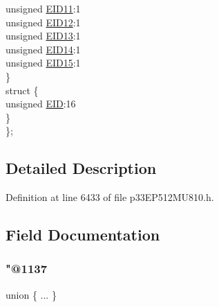 \begin{DoxyCompactItemize}
\begin{tabbing}
\>\>unsigned \hyperlink{structtag_c2_r_x_f4_e_i_d_b_i_t_s_a710bdb0d602deb021b0be99066008018}{EID11}:1\\
\>\>unsigned \hyperlink{structtag_c2_r_x_f4_e_i_d_b_i_t_s_aa347bb85867bd8d4e0124f7cff8c6472}{EID12}:1\\
\>\>unsigned \hyperlink{structtag_c2_r_x_f4_e_i_d_b_i_t_s_a37d5f3edcbf6ef62f848fd4f3c584f79}{EID13}:1\\
\>\>unsigned \hyperlink{structtag_c2_r_x_f4_e_i_d_b_i_t_s_a7ffc0b0e0d99b8476b6f9a45337c17ab}{EID14}:1\\
\>\>unsigned \hyperlink{structtag_c2_r_x_f4_e_i_d_b_i_t_s_a293cd7dc1746257fa75a60cbd9383cd7}{EID15}:1\\
\>\} \\
\>struct \{\\
\>\>unsigned \hyperlink{structtag_c2_r_x_f4_e_i_d_b_i_t_s_ae80b378c9141f7c03e0b4e55b5f4b54d}{EID}:16\\
\>\} \\
\}; \\

\end{tabbing}\end{DoxyCompactItemize}


\subsection{Detailed Description}


Definition at line 6433 of file p33\+E\+P512\+M\+U810.\+h.



\subsection{Field Documentation}
\mbox{\label{structtag_c2_r_x_f4_e_i_d_b_i_t_s_a7eab920b9da5f51734c5407b285c7086}} 
\subsubsection{\texorpdfstring{"@1137}{@1137}}
{\footnotesize\ttfamily union \{ ... \} }

\mbox{\label{structtag_c2_r_x_f4_e_i_d_b_i_t_s_ae80b378c9141f7c03e0b4e55b5f4b54d}} 
